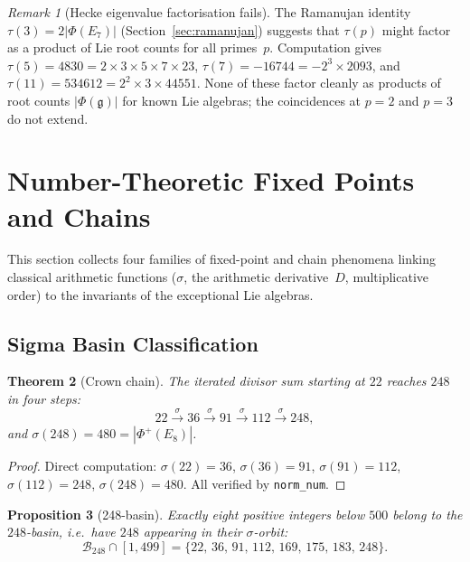 \documentclass[11pt]{amsart}
\theoremstyle{plain}
\newtheorem{theorem}{Theorem}[section]
\newtheorem{proposition}[theorem]{Proposition}
\theoremstyle{definition}
\theoremstyle{remark}
\newtheorem{remark}[theorem]{Remark}
\newcommand{\fg}{\mathfrak{g}}
\renewcommand{\Phi}{\varPhi}
\begin{document}
\begin{remark}[Hecke eigenvalue factorisation fails]\label{rem:hecke-hn}
The Ramanujan identity $\tau(3) = 2|\Phi(E_7)|$ (Section~\ref{sec:ramanujan})
suggests that $\tau(p)$ might factor as a product of Lie root counts for
all primes~$p$.  Computation gives $\tau(5) = 4830 = 2 \times 3 \times 5
\times 7 \times 23$, $\tau(7) = -16744 = -2^3 \times 2093$, and
$\tau(11) = 534612 = 2^2 \times 3 \times 44551$.  None of these
factor cleanly as products of root counts $|\Phi(\fg)|$ for known
Lie algebras; the coincidences at $p = 2$ and $p = 3$ do not extend.
\end{remark}

\section{Number-Theoretic Fixed Points and Chains}\label{sec:fixed-points}

This section collects four families of fixed-point and chain phenomena
linking classical arithmetic functions ($\sigma$, the arithmetic
derivative~$D$, multiplicative order) to the invariants of the
exceptional Lie algebras.

\subsection{Sigma Basin Classification}\label{sec:sigma-basin}

\begin{theorem}[Crown chain]\label{thm:crown-chain}
The iterated divisor sum starting at $22$ reaches $248$ in four steps:
\[
  22 \xrightarrow{\sigma} 36 \xrightarrow{\sigma} 91
     \xrightarrow{\sigma} 112 \xrightarrow{\sigma} 248,
\]
and $\sigma(248) = 480 = |\Phi^+(E_8)|$.
\end{theorem}

\begin{proof}
Direct computation: $\sigma(22)=36$, $\sigma(36)=91$, $\sigma(91)=112$,
$\sigma(112)=248$, $\sigma(248)=480$.  All verified by \texttt{norm\_num}.
\end{proof}

\begin{proposition}[248-basin]\label{prop:248-basin}
Exactly eight positive integers below $500$ belong to the $248$-basin,
i.e.\ have $248$ appearing in their $\sigma$-orbit:
\[
  \mathcal{B}_{248} \cap [1,499]
  = \{22,\, 36,\, 91,\, 112,\, 169,\, 175,\, 183,\, 248\}.
\]
\end{proposition}
\end{document}
